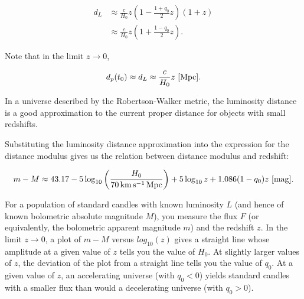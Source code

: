 \documentclass[a4paper,11pt]{article}
\begin{document}
\begin{align*}
    d_L &\approx \frac{c}{H_0}z \left(1-\frac{1+q_0}{2}z\right)(1+z) \\
        & \approx \frac{c}{H_0}z \left(1+\frac{1-q_0}{2}z\right).
\end{align*}

{\noindent}Note that in the limit $z\rightarrow0$,

\begin{align*}
    d_p(t_0) \approx d_L \approx \frac{c}{H_0}z ~ [{\rm Mpc}].
\end{align*}

{\noindent}In a universe described by the Robertson-Walker metric, the luminosity distance is a good approximation to the current proper distance for objects with small redshifts.

{\noindent}Substituting the luminosity distance approximation into the expression for the distance modulus gives us the relation between distance modulus and redshift:

\begin{align*}
    m - M \approx 43.17 - 5\log_{10} \left(\frac{H_0}{70\,{\rm km\,s^{-1}\,Mpc}}\right) + 5\log_{10}z + 1.086(1-q_0)z ~ [{\rm mag}].
\end{align*}

{\noindent}For a population of standard candles with known luminosity $L$ (and hence of known bolometric absolute magnitude $M$), you measure the flux $F$ (or equivalently, the bolometric apparent magnitude $m$) and the redshift $z$. In the limit $z\rightarrow0$, a plot of $m − M$ versus $log_{10}(z)$ gives a straight line whose amplitude at a given value of $z$ tells you the value of $H_0$. At slightly larger values of $z$, the deviation of the plot from a straight line tells you the value of $q_0$. At a given value of $z$, an accelerating universe (with $q_0<0$) yields standard candles with a smaller flux than would a decelerating universe (with $q_0>0$).
\end{document}
